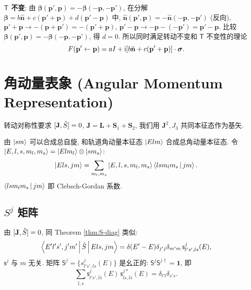 \textbf{$\mathsf{T}$ 不变}: 由 $\bm{\beta}(\mathbf{p}',\mathbf{p})=-\bm{\beta}(-\mathbf{p},-\mathbf{p}')$, 在分解 $\bm{\beta}=b\hat{\mathbf{n}}+c(\mathbf{p}'+\mathbf{p})+d(\mathbf{p}'-\mathbf{p})$ 中, $\hat{\mathbf{n}}(\mathbf{p}',\mathbf{p})=-\hat{\mathbf{n}}(-\mathbf{p},-\mathbf{p}')$ (反向), $\mathbf{p}'+\mathbf{p}\to -(\mathbf{p}+\mathbf{p}')=-(\mathbf{p}'+\mathbf{p})$, $\mathbf{p}'-\mathbf{p}\to -\mathbf{p}-(-\mathbf{p}')=\mathbf{p}'-\mathbf{p}$. 比较 $\bm{\beta}(\mathbf{p}',\mathbf{p})=-\bm{\beta}(-\mathbf{p},-\mathbf{p}')$, 得 $d=0$. 所以同时满足转动不变和 $\mathsf{T}$ 不变性的理论
\begin{equation}
F(\mathbf{p}'\leftarrow \mathbf{p})=aI+\mathrm{i}[b\hat{\mathbf{n}}+c(\mathbf{p}'+\mathbf{p})]\cdot \bm{\sigma}.
\end{equation}


\section{角动量表象 (Angular Momentum Representation)}\label{sec:Jrep}

转动对称性要求 $[\mathbf{J},\hat{S}]=0$, $\mathbf{J}=\mathbf{L}+\mathbf{S}_1+\mathbf{S}_2$, 我们用 $\mathbf{J}^2,J_3$ 共同本征态作为基矢.

由 $\ket{sm}$ 可以合成总自旋, 和轨道角动量本征态 $\ket{Elm}$ 合成总角动量本征态. 令 $\ket{E,l,s,m_l,m_s}=\ket{Elm_l}\otimes \ket{sm_s}$:
\begin{equation}\label{eq:LS-coupling}
\ket{Els,jm}=\sum_{m_l,m_s}\ket{E,l,s,m_l,m_s}\left\langle lsm_lm_s \,\middle|\, jm \right\rangle.
\end{equation}
$\left\langle lsm_lm_s \,\middle|\, jm \right\rangle$ 即 Clebsch-Gordan 系数.

\subsection{$S^j$ 矩阵}

由 $[\mathbf{J},\hat{S}]=0$, 同 Theorem \ref{thm:S-diag} 类似:
\begin{equation}
\left\langle E'l's',j'm' \,\middle|\, \hat{S} \,\middle|\, Els,jm \right\rangle=\delta(E'-E)\delta_{j'j}\delta_{m'm}\,\mathsf{s}^{j}_{l's',ls}(E),
\end{equation}
$\mathsf{s}^j$ 与 $m$ 无关. 矩阵 $\mathsf{S}^j=\{s^j_{l's',ls}(E)\}$ 是幺正的: $\mathsf{S}^j \mathsf{S}^{j\dagger}=\mathbf{1}$, 即
\begin{equation}
\sum_{\bar l,\bar s}\mathsf{s}^j_{l's',\bar l\bar s}(E)\,\mathsf{s}^{j*}_{ls,\bar l\bar s}(E)=\delta_{l'l}\delta_{s's}.
\end{equation}

